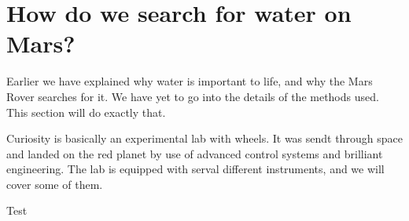 \section*{How do we search for water on Mars?}
Earlier we have explained why water is important to life, and why the Mars Rover searches for it.
We have yet to go into the details of the methods used.
This section will do exactly that.


Curiosity is basically an experimental lab with wheels.
It was sendt through space and landed on the red planet by use of advanced control systems and brilliant engineering.
The lab is equipped with serval different instruments, and we will cover some of them.

Test